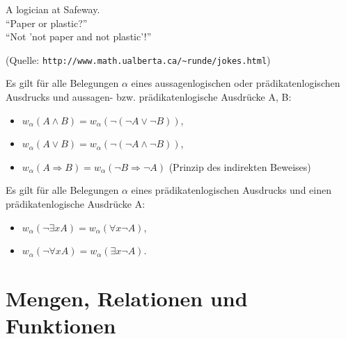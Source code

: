 \documentclass[10pt]{scrbook}
\begin{document}
A logician at Safeway. \\
"`Paper or plastic?"' \\
"`Not 'not paper and not plastic'!"'

(Quelle: \verb|http://www.math.ualberta.ca/~runde/jokes.html|)

\begin{Le}
Es gilt für alle Belegungen $\alpha$ eines aussagenlogischen oder prädikatenlogischen Ausdrucks und aussagen- bzw. prädikatenlogische Ausdrücke A, B:
\begin{itemize}
	\item $w_\alpha\left(A\wedge B\right)=w_\alpha\left(\neg\left (\neg A \vee \neg B\right)\right)$,
	\item $w_\alpha\left(A\vee B\right)=w_\alpha\left(\neg\left (\neg A \wedge \neg B\right)\right)$,
	\item $w_\alpha\left(A \Rightarrow B\right)=w_\alpha\left(\neg B \Rightarrow \neg A\right)$ (Prinzip des indirekten Beweises)
\end{itemize}
\end{Le}

\begin{Le}
Es gilt für alle Belegungen $\alpha$ eines prädikatenlogischen Ausdrucks und einen prädikatenlogische Ausdrücke A:
\begin{itemize}
	\item $w_\alpha\left(\neg\exists x A\right)=w_\alpha\left(\forall x \neg A\right)$,
	\item $w_\alpha\left(\neg\forall x A\right)=w_\alpha\left(\exists x \neg A\right)$.
\end{itemize}
\end{Le}

\section{Mengen, Relationen und Funktionen}
\end{document}

